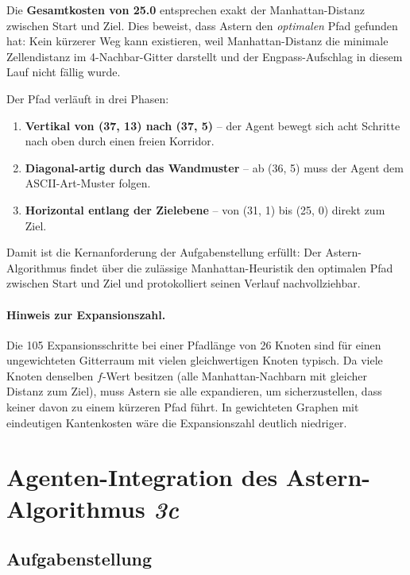 Die \textbf{Gesamtkosten von 25.0} entsprechen exakt der Manhattan-Distanz zwischen Start und Ziel. Dies beweist, dass \acs{Astern} den \textit{optimalen} Pfad gefunden hat: Kein kürzerer Weg kann existieren, weil Manhattan-Distanz die minimale Zellendistanz im 4-Nachbar-Gitter darstellt und der Engpass-Aufschlag in diesem Lauf nicht fällig wurde.

Der Pfad verläuft in drei Phasen:
\begin{enumerate}
    \item \textbf{Vertikal von (37, 13) nach (37, 5)} -- der Agent bewegt sich acht Schritte nach oben durch einen freien Korridor.
    \item \textbf{Diagonal-artig durch das Wandmuster} -- ab (36, 5) muss der Agent dem \acs{ASCII}-Art-Muster folgen.
    \item \textbf{Horizontal entlang der Zielebene} -- von (31, 1) bis (25, 0) direkt zum Ziel.
\end{enumerate}

Damit ist die Kernanforderung der Aufgabenstellung erfüllt: Der \acs{Astern}-Algorithmus findet über die zulässige Manhattan-Heuristik den optimalen Pfad zwischen Start und Ziel und protokolliert seinen Verlauf nachvollziehbar.

\paragraph{Hinweis zur Expansionszahl.}
Die 105 Expansionsschritte bei einer Pfadlänge von 26 Knoten sind für einen ungewichteten Gitterraum mit vielen gleichwertigen Knoten typisch. Da viele Knoten denselben \(f\)-Wert besitzen (alle Manhattan-Nachbarn mit gleicher Distanz zum Ziel), muss \acs{Astern} sie alle expandieren, um sicherzustellen, dass keiner davon zu einem kürzeren Pfad führt. In gewichteten Graphen mit eindeutigen Kantenkosten wäre die Expansionszahl deutlich niedriger.


\section{Agenten-Integration des \acs{Astern}-Algorithmus \textit{3c}}
\label{sec:aufgabe3c}

\subsection{Aufgabenstellung}

